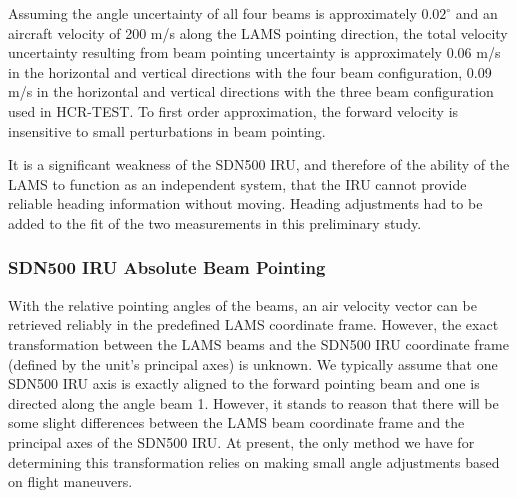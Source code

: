 \documentclass[12pt,twoside,english]{article}\usepackage[]{graphicx}\usepackage[]{color}
\begin{document}
Assuming the angle uncertainty of all four beams is approximately $0.02^{\circ}$ and an aircraft velocity of 200 m/s along the LAMS pointing direction, the total velocity uncertainty resulting from beam pointing uncertainty is approximately 0.06 m/s in the horizontal and vertical directions with the four beam configuration, 0.09 m/s in the horizontal and vertical directions with the three beam configuration used in HCR-TEST. To first order approximation, the forward velocity is insensitive to small perturbations in beam pointing. 


It is a significant weakness of the SDN500 IRU, and therefore of the ability of the LAMS to function as an independent system, that the IRU cannot provide reliable heading information without moving. Heading adjustments had to be added to the fit of the two measurements in this preliminary study.

\subsubsection{SDN500 IRU Absolute Beam Pointing\label{sub:Absolute}}

With the relative pointing angles of the beams, an air velocity vector can be retrieved reliably in the predefined LAMS coordinate frame. However, the exact transformation between the LAMS beams and the SDN500 IRU coordinate frame (defined by the unit's principal axes) is unknown. We typically assume that one SDN500 IRU axis is exactly aligned to the forward pointing beam and one is directed along the angle beam 1. However, it stands to reason that there will be some slight differences between the LAMS beam coordinate frame and the principal axes of the SDN500 IRU. At present, the only method we have for determining this transformation relies on making small angle adjustments based on flight maneuvers. 
\end{document}
